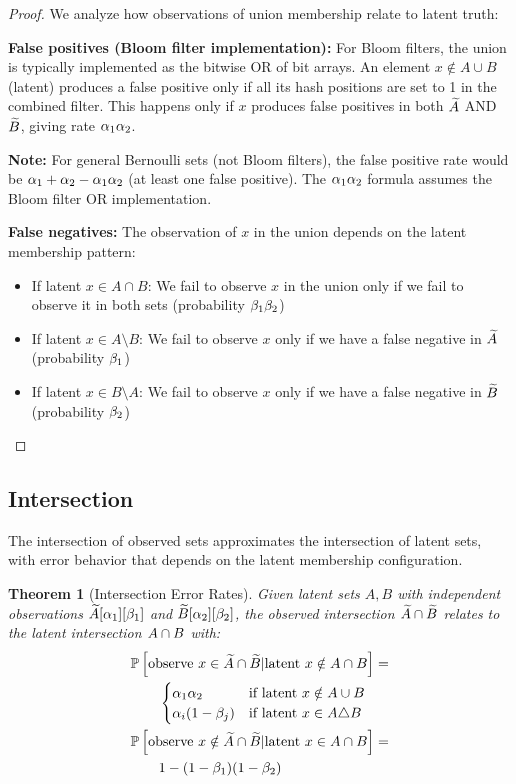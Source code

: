 \documentclass[11pt,final,hidelinks]{article}
\newtheorem{theorem}{Theorem}[section]
\begin{document}
\begin{proof}
We analyze how observations of union membership relate to latent truth:

\textbf{False positives (Bloom filter implementation):} For Bloom filters, the union is typically implemented as the bitwise OR of bit arrays. An element $x \notin A \cup B$ (latent) produces a false positive only if all its hash positions are set to 1 in the combined filter. This happens only if $x$ produces false positives in both $\widetilde{A}$ AND $\widetilde{B}$, giving rate $\alpha_1 \alpha_2$.

\textbf{Note:} For general Bernoulli sets (not Bloom filters), the false positive rate would be $\alpha_1 + \alpha_2 - \alpha_1\alpha_2$ (at least one false positive). The $\alpha_1 \alpha_2$ formula assumes the Bloom filter OR implementation.

\textbf{False negatives:} The observation of $x$ in the union depends on the latent membership pattern:
\begin{itemize}
    \item If latent $x \in A \cap B$: We fail to observe $x$ in the union only if we fail to observe it in both sets (probability $\beta_1 \beta_2$)
    \item If latent $x \in A \setminus B$: We fail to observe $x$ only if we have a false negative in $\widetilde{A}$ (probability $\beta_1$)
    \item If latent $x \in B \setminus A$: We fail to observe $x$ only if we have a false negative in $\widetilde{B}$ (probability $\beta_2$)
\end{itemize}
\end{proof}

\subsection{Intersection}

The intersection of observed sets approximates the intersection of latent sets, with error behavior that depends on the latent membership configuration.

\begin{theorem}[Intersection Error Rates]
Given latent sets $A, B$ with independent observations $\widetilde{A}[\alpha_1][\beta_1]$ and $\widetilde{B}[\alpha_2][\beta_2]$, the observed intersection $\widetilde{A} \cap \widetilde{B}$ relates to the latent intersection $A \cap B$ with:
\begin{align}
&\mathbb{P}\left[\text{observe } x \in \widetilde{A} \cap \widetilde{B} | \text{latent } x \notin A \cap B\right] = \\
&\qquad\begin{cases}
\alpha_1 \alpha_2 & \text{if latent } x \notin A \cup B \\
\alpha_i(1-\beta_j) & \text{if latent } x \in A \triangle B
\end{cases} \\
&\mathbb{P}\left[\text{observe } x \notin \widetilde{A} \cap \widetilde{B} | \text{latent } x \in A \cap B\right] = \\
&\qquad 1 - (1-\beta_1)(1-\beta_2)
\end{align}
\end{theorem}
\end{document}
